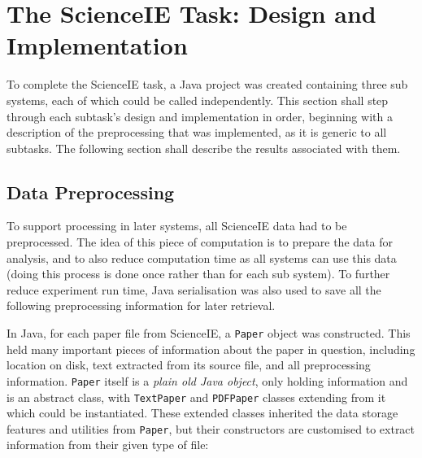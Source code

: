 \chapter{The ScienceIE Task: Design and Implementation}

To complete the ScienceIE task, a Java project was created containing three sub systems, each of which could be called independently. This section shall step through each subtask's design and implementation in order, beginning with a description of the preprocessing that was implemented, as it is generic to all subtasks. The following section shall describe the results associated with them.

\section{Data Preprocessing}
To support processing in later systems, all ScienceIE data had to be preprocessed. The idea of this piece of computation is to prepare the data for analysis, and to also reduce computation time as all systems can use this data (doing this process is done once rather than for each sub system). To further reduce experiment run time, Java serialisation was also used to save all the following preprocessing information for later retrieval.

In Java, for each paper file from ScienceIE, a \texttt{Paper} object was constructed. This held many important pieces of information about the paper in question, including location on disk, text extracted from its source file, and all preprocessing information. \texttt{Paper} itself is a \textit{plain old Java object}, only holding information and is an abstract class, with \texttt{TextPaper} and \texttt{PDFPaper} classes extending from it which could be instantiated. These extended classes inherited the data storage features and utilities from \texttt{Paper}, but their constructors are customised to extract information from their given type of file:

